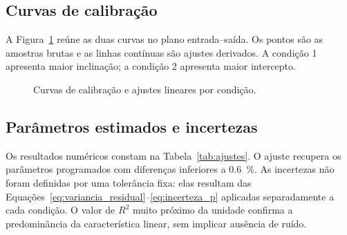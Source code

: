\documentclass[12pt,a4paper]{article}
\begin{document}
\subsection{Curvas de calibração}

A Figura~\ref{fig:calibracao} reúne as duas curvas no plano entrada--saída. Os pontos são as amostras brutas e as linhas contínuas são ajustes derivados. A condição 1 apresenta maior inclinação; a condição 2 apresenta maior intercepto.

\begin{figure}[H]
  \centering
  \caption{Curvas de calibração e ajustes lineares por condição.}
  \label{fig:calibracao}
\end{figure}

\subsection{Parâmetros estimados e incertezas}
\label{sec:parametros_estimados}

Os resultados numéricos constam na Tabela~\ref{tab:ajustes}. O ajuste recupera os parâmetros programados com diferenças inferiores a \SI{0.6}{\percent}. As incertezas não foram definidas por uma tolerância fixa: elas resultam das Equações~\eqref{eq:variancia_residual}--\eqref{eq:incerteza_p} aplicadas separadamente a cada condição. O valor de $R^2$ muito próximo da unidade confirma a predominância da característica linear, sem implicar ausência de ruído.
\end{document}
